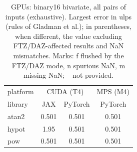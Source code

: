 \begin{table}
\centering
\begin{small}
\begin{tabular}{|l|cc|c|}
\hline
platform & \multicolumn{2}{c|}{CUDA (T4)} & \multicolumn{1}{c|}{MPS (M4)} \\
library & JAX & PyTorch & PyTorch \\ \hline
atan2 & 0.501 & 0.501 & 0.501 \\
hypot & 1.95 & 0.501 & 0.501 \\
pow & 0.501 & 0.501 & 0.501 \\
\hline
\end{tabular}
\end{small}
\caption{GPUs: binary16 bivariate, all pairs of inputs (exhaustive). Largest error in ulps (rules of Gladman et al.); in parentheses, when different, the value excluding FTZ/DAZ-affected results and NaN mismatches. Marks: f flushed by the FTZ/DAZ mode, n spurious NaN, m missing NaN; -- not provided.}
\label{tab:b16bigpu}
\end{table}
